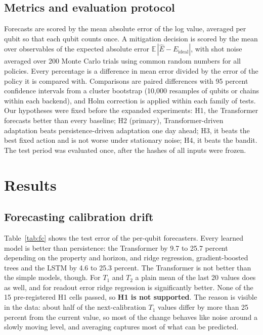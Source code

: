 \documentclass[conference]{IEEEtran}
\begin{document}
\subsection{Metrics and evaluation protocol}
Forecasts are scored by the mean absolute error of the log value, averaged per qubit so that each qubit counts once. A mitigation decision is scored by the mean over observables of the expected absolute error $\mathbb{E}\,|\hat{E}-E_{\mathrm{ideal}}|$, with shot noise averaged over 200 Monte Carlo trials using common random numbers for all policies. Every percentage is a difference in mean error divided by the error of the policy it is compared with. Comparisons are paired differences with 95 percent confidence intervals from a cluster bootstrap (10,000 resamples of qubits or chains within each backend), and Holm correction is applied within each family of tests. Our hypotheses were fixed before the expanded experiments: H1, the Transformer forecasts better than every baseline; H2 (primary), Transformer-driven adaptation beats persistence-driven adaptation one day ahead; H3, it beats the best fixed action and is not worse under stationary noise; H4, it beats the bandit. The test period was evaluated once, after the hashes of all inputs were frozen.

\section{Results}
\subsection{Forecasting calibration drift}
Table~\ref{tab:fc} shows the test error of the per-qubit forecasters. Every learned model is better than persistence: the Transformer by 9.7 to 25.7 percent depending on the property and horizon, and ridge regression, gradient-boosted trees and the LSTM by 4.6 to 25.3 percent. The Transformer is not better than the simple models, though. For $T_1$ and $T_2$ a plain mean of the last 20 values does as well, and for readout error ridge regression is significantly better. None of the 15 pre-registered H1 cells passed, so \textbf{H1 is not supported}. The reason is visible in the data: about half of the next-calibration $T_1$ values differ by more than 25 percent from the current value, so most of the change behaves like noise around a slowly moving level, and averaging captures most of what can be predicted.
\end{document}
